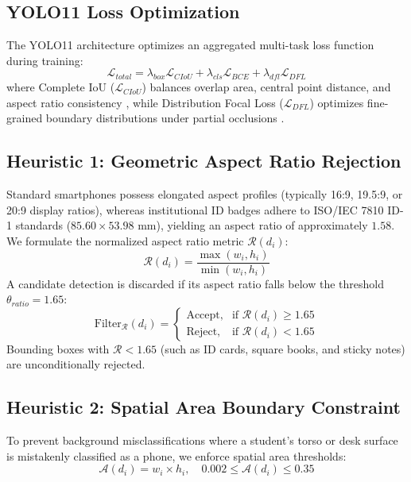 \documentclass[conference]{IEEEtran}
\begin{document}
\subsection{YOLO11 Loss Optimization}
The YOLO11 architecture optimizes an aggregated multi-task loss function during training:
\begin{equation}
\mathcal{L}_{total} = \lambda_{box} \mathcal{L}_{CIoU} + \lambda_{cls} \mathcal{L}_{BCE} + \lambda_{dfl} \mathcal{L}_{DFL}
\end{equation}
where Complete IoU ($\mathcal{L}_{CIoU}$) balances overlap area, central point distance, and aspect ratio consistency \cite{zheng2020distance}, while Distribution Focal Loss ($\mathcal{L}_{DFL}$) optimizes fine-grained boundary distributions under partial occlusions \cite{li2020generalized}.

\subsection{Heuristic 1: Geometric Aspect Ratio Rejection}
Standard smartphones possess elongated aspect profiles (typically 16:9, 19.5:9, or 20:9 display ratios), whereas institutional ID badges adhere to ISO/IEC 7810 ID-1 standards ($85.60 \times 53.98$ mm), yielding an aspect ratio of approximately $1.58$. We formulate the normalized aspect ratio metric $\mathcal{R}(d_i)$:
\begin{equation}
\mathcal{R}(d_i) = \frac{\max(w_i, h_i)}{\min(w_i, h_i)}
\end{equation}
A candidate detection is discarded if its aspect ratio falls below the threshold $\theta_{ratio} = 1.65$:
\begin{equation}
\text{Filter}_{\mathcal{R}}(d_i) = \begin{cases} \text{Accept}, & \text{if } \mathcal{R}(d_i) \ge 1.65 \\ \text{Reject}, & \text{if } \mathcal{R}(d_i) < 1.65 \end{cases}
\end{equation}
Bounding boxes with $\mathcal{R} < 1.65$ (such as ID cards, square books, and sticky notes) are unconditionally rejected.

\subsection{Heuristic 2: Spatial Area Boundary Constraint}
To prevent background misclassifications where a student's torso or desk surface is mistakenly classified as a phone, we enforce spatial area thresholds:
\begin{equation}
\mathcal{A}(d_i) = w_i \times h_i, \quad 0.002 \le \mathcal{A}(d_i) \le 0.35
\end{equation}
\end{document}
